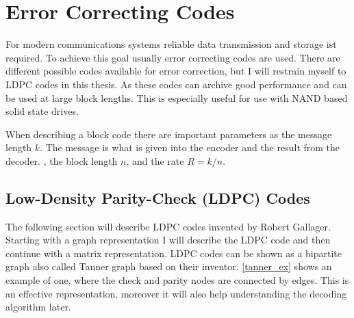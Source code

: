 
\chapter{Error Correcting Codes}

For modern communications systems reliable data transmission and storage ist required. To achieve this goal usually error correcting codes are used. There are different possible codes available for error correction, but I will restrain myself to LDPC\cite{Ga63} codes in this thesis. As these codes can archive good performance and can be used at large block lengths\cite{TaSc2017}. This is especially useful for use with NAND based solid state drives.

When describing a block code there are important parameters as the message length $k$. The message is what is given into the encoder and the result from the decoder.
, the block length $n$, and the rate $R = k / n$. 


\section{Low-Density Parity-Check (LDPC) Codes}

The following section will describe LDPC codes invented by Robert Gallager\cite{Ga63}. Starting with a graph representation I will describe the LDPC code and then continue with a matrix representation. LDPC codes can be shown as a bipartite graph also called Tanner graph\cite{Ta81} based on their inventor. \cref{tanner_ex} shows an example of one, where the check and parity nodes are connected by edges. This is an effective representation, moreover it will also help understanding the decoding algorithm later.

